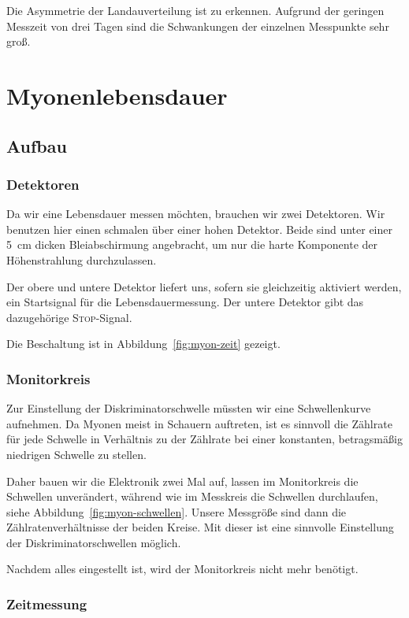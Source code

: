 \documentclass[11pt, ngerman, fleqn, DIV=15, headinclude, BCOR=2cm]{scrreprt}
\begin{document}
Die Asymmetrie der Landauverteilung ist zu erkennen. Aufgrund der geringen
Messzeit von drei Tagen sind die Schwankungen der einzelnen Messpunkte sehr groß.

\chapter{Myonenlebensdauer}

\section{Aufbau}

\subsection{Detektoren}

Da wir eine Lebensdauer messen möchten, brauchen wir zwei Detektoren. Wir
benutzen hier einen schmalen über einer hohen Detektor. Beide sind unter einer
\SI{5}{\centi\meter} dicken Bleiabschirmung angebracht, um nur die harte
Komponente der Höhenstrahlung durchzulassen.

Der obere und untere Detektor liefert uns, sofern sie gleichzeitig aktiviert
werden, ein Startsignal für die Lebensdauermessung. Der untere Detektor gibt
das dazugehörige \textsc{Stop}-Signal.

Die Beschaltung ist in Abbildung~\ref{fig:myon-zeit} gezeigt.

\subsection{Monitorkreis}

Zur Einstellung der Diskriminatorschwelle müssten wir eine Schwellenkurve
aufnehmen. Da Myonen meist in Schauern auftreten, ist es sinnvoll die Zählrate
für jede Schwelle in Verhältnis zu der Zählrate bei einer konstanten,
betragsmäßig niedrigen Schwelle zu stellen.

Daher bauen wir die Elektronik zwei Mal auf, lassen im Monitorkreis die
Schwellen unverändert, während wie im Messkreis die Schwellen durchlaufen,
siehe Abbildung~\ref{fig:myon-schwellen}. Unsere Messgröße sind dann die
Zählratenverhältnisse der beiden Kreise. Mit dieser ist eine sinnvolle
Einstellung der Diskriminatorschwellen möglich.

Nachdem alles eingestellt ist, wird der Monitorkreis nicht mehr benötigt.


\subsection{Zeitmessung}
\end{document}
